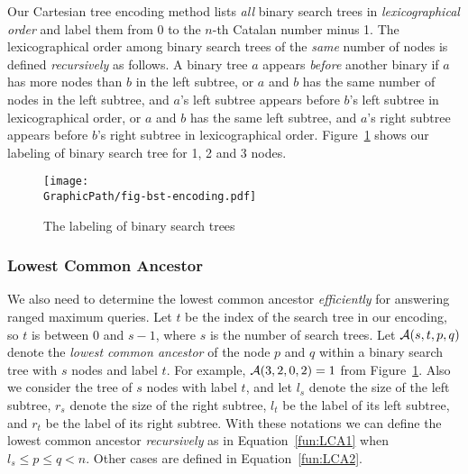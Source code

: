 Our Cartesian tree encoding method lists {\em all} binary search trees
in {\em lexicographical order} and label them from $0$ to the $n$-th
Catalan number minus 1.  The lexicographical order among binary search
trees of the {\em same} number of nodes is defined {\em recursively}
as follows.  A binary tree $a$ appears {\em before} another binary if
$a$ has more nodes than $b$ in the left subtree, or $a$ and $b$ has
the same number of nodes in the left subtree, and $a$'s left subtree
appears before $b$'s left subtree in lexicographical order, or $a$ and
$b$ has the same left subtree, and $a$'s right subtree appears before
$b$'s right subtree in lexicographical order.
Figure~\ref{fig:labelingBST} shows our labeling of binary search tree
for 1, 2 and 3 nodes.

\begin{figure}[!thb]
  \centering
  \texttt{[image: \\GraphicPath/fig-bst-encoding.pdf]}
  \caption{The labeling of binary search trees}
  \label{fig:labelingBST}
\end{figure}

\subsubsection{Lowest Common Ancestor}

We also need to determine the lowest common ancestor {\em efficiently}
for answering ranged maximum queries.  Let $t$ be the index of the
search tree in our encoding, so $t$ is between 0 and $s - 1$, where
$s$ is the number of search trees.  Let ${\cal A}(s, t, p, q)$ denote
the {\em lowest common ancestor} of the node $p$ and $q$ within a
binary search tree with $s$ nodes and label $t$.  For example, ${\cal
  A}(3, 2, 0, 2) = 1$ from Figure~\ref{fig:labelingBST}.  Also we
consider the tree of $s$ nodes with label $t$, and let $l_s$ denote
the size of the left subtree, $r_s$ denote the size of the right
subtree, $l_t$ be the label of its left subtree, and $r_t$ be the
label of its right subtree.  With these notations we can define the
lowest common ancestor {\em recursively} as in Equation~\ref{fun:LCA1}
when $l_s \le p \le q < n$.  Other cases are defined in
Equation~\ref{fun:LCA2}.



